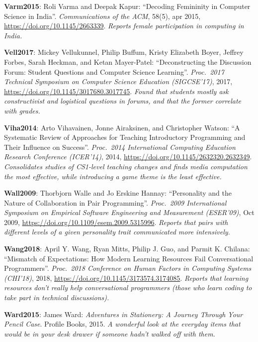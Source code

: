 \textbf{\hypertarget{b:Varm2015}{Varm2015}\label{b:Varm2015}}: Roli Varma and Deepak Kapur: ``Decoding Femininity in Computer Science in India''. \emph{Communications of the ACM}, 58(5), apr 2015, \url{https://doi.org/10.1145/2663339}. \emph{Reports female participation in computing in India.}

\textbf{\hypertarget{b:Vell2017}{Vell2017}\label{b:Vell2017}}: Mickey Vellukunnel, Philip Buffum, Kristy Elizabeth Boyer, Jeffrey Forbes, Sarah Heckman, and Ketan Mayer-Patel: ``Deconstructing the Discussion Forum: Student Questions and Computer Science Learning''. \emph{Proc.\ 2017 Technical Symposium on Computer Science Education (SIGCSE'17)}, 2017, \url{https://doi.org/10.1145/3017680.3017745}. \emph{Found that students mostly ask constructivist and logistical questions in forums, and that the former correlate with grades.}

\textbf{\hypertarget{b:Viha2014}{Viha2014}\label{b:Viha2014}}: Arto Vihavainen, Jonne Airaksinen, and Christopher Watson: ``A Systematic Review of Approaches for Teaching Introductory Programming and Their Influence on Success''. \emph{Proc.\ 2014 International Computing Education Research Conference (ICER'14)}, 2014, \url{https://doi.org/10.1145/2632320.2632349}. \emph{Consolidates studies of CS1-level teaching changes and finds media computation the most effective, while introducing a game theme is the least effective.}

\textbf{\hypertarget{b:Wall2009}{Wall2009}\label{b:Wall2009}}: Thorbjorn Walle and Jo Erskine Hannay: ``Personality and the Nature of Collaboration in Pair Programming''. \emph{Proc.\ 2009 International Symposium on Empirical Software Engineering and Measurement (ESER'09)}, Oct 2009, \url{https://doi.org/10.1109/esem.2009.5315996}. \emph{Reports that pairs with different levels of a given personality trait communicated more intensively.}

\textbf{\hypertarget{b:Wang2018}{Wang2018}\label{b:Wang2018}}: April Y. Wang, Ryan Mitts, Philip J. Guo, and Parmit K. Chilana: ``Mismatch of Expectations: How Modern Learning Resources Fail Conversational Programmers''. \emph{Proc.\ 2018 Conference on Human Factors in Computing Systems (CHI'18)}, 2018, \url{https://doi.org/10.1145/3173574.3174085}. \emph{Reports that learning resources don't really help conversational programmers (those who learn coding to take part in technical discussions).}

\textbf{\hypertarget{b:Ward2015}{Ward2015}\label{b:Ward2015}}: James Ward: \emph{Adventures in Stationery: A Journey Through Your Pencil Case}. Profile Books, 2015. \emph{A wonderful look at the everyday items that would be in your desk drawer if someone hadn't walked off with them.}

